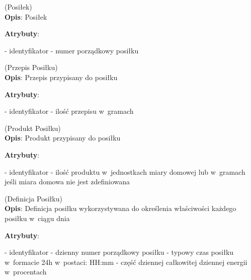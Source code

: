 \begin{enumerate}[label={\textbf{KAT/3/\protect\twodigits{\theenumi}}}, wide, labelwidth=!, labelindent=0pt, labelsep=0pt, series=reqs]
    \label{kat:Meal} (Posiłek)\\
    \indent\textbf{Opis}: Posiłek
    \par
    \textbf{Atrybuty}:
    \begin{itemize}[series=atr, wide, align=left, leftmargin=190pt]
        \label{kat:Meal:id}- identyfikator
        \label{kat:Meal:ordinalNumber}- numer porządkowy posiłku
    \end{itemize}

    \label{kat:MealRecipe} (Przepis Posiłku)\\
    \indent\textbf{Opis}: Przepis przypisany do posiłku
    \par
    \textbf{Atrybuty}:
    \begin{itemize}[series=atr, wide, align=left, leftmargin=190pt]
        \label{kat:MealRecipe:id}- identyfikator
        \label{kat:MealRecipe:amount}- ilość przepisu w~gramach
    \end{itemize}

    \label{kat:MealProduct} (Produkt Posiłku)\\
    \indent\textbf{Opis}: Produkt przypisany do posiłku
    \par
    \textbf{Atrybuty}:
    \begin{itemize}[series=atr, wide, align=left, leftmargin=190pt]
        \label{kat:MealProduct:id}- identyfikator
        \label{kat:MealProduct:amount}- ilość produktu w~jednostkach miary domowej lub w~gramach jeśli miara domowa nie jest zdefiniowana
    \end{itemize}

    \label{kat:MealDefinition} (Definicja Posiłku)\\
    \indent\textbf{Opis}: Definicja posiłku wykorzystywana do określenia właściwości każdego posiłku w~ciągu dnia
    \par
    \textbf{Atrybuty}:
    \begin{itemize}[series=atr, wide, align=left, leftmargin=190pt]
        \label{kat:MealDefinition:id}- identyfikator
        \label{kat:MealDefinition:ordinalNumber}- dzienny numer porządkowy posiłku
        \label{kat:MealDefinition:timeOfMeal}- typowy czas posiłku w~formacie 24h w~postaci: HH:mm
        \label{kat:MealDefinition:percentOfEnergy}- część dziennej całkowitej dziennej energii w~procentach
    \end{itemize}

\end{enumerate}

